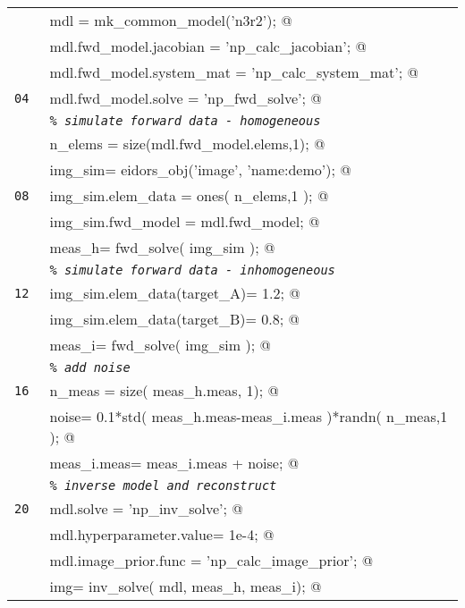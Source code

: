 \documentclass[12pt]{iopart}
\makeatletter
\newcommand{\CODEstart}{\medskip\begin{tabular}{ll}}
\newcommand{\CN}{\tt\scriptsize} %
\newcommand{\CC}{&\small\verb@}   % start code
\newcommand{\CI}{&\small\tt\em}   % start code
\newcommand{\CODEend}{\end{tabular}\medskip}
\makeatother
\begin{document}
\CODEstart
\CN    \CC mdl  = mk_common_model('n3r2');   @\\[-3pt]
\CN    \CC mdl.fwd_model.jacobian   = 'np_calc_jacobian';   @\\[-3pt]
\CN    \CC mdl.fwd_model.system_mat = 'np_calc_system_mat';   @\\[-3pt]
\CN 04 \CC mdl.fwd_model.solve      = 'np_fwd_solve';   @\\[-3pt]
\CN    \CI \% simulate forward data - homogeneous \\[-3pt]
\CN    \CC n_elems = size(mdl.fwd_model.elems,1);   @\\[-3pt]
\CN    \CC img_sim= eidors_obj('image', 'name:demo');   @\\[-3pt]
\CN 08 \CC img_sim.elem_data = ones( n_elems,1 );    @\\[-3pt]
\CN    \CC img_sim.fwd_model = mdl.fwd_model;   @\\[-3pt]
\CN    \CC meas_h= fwd_solve( img_sim );   @\\[-3pt]
\CN    \CI \% simulate forward data - inhomogeneous \\[-3pt]
\CN 12 \CC img_sim.elem_data(target_A)= 1.2;   @\\[-3pt]
\CN    \CC img_sim.elem_data(target_B)= 0.8;   @\\[-3pt]
\CN    \CC meas_i= fwd_solve( img_sim );   @\\[-3pt]
\CN    \CI \% add noise \\[-3pt]
\CN 16 \CC n_meas = size( meas_h.meas, 1); @\\[-3pt]
\CN    \CC noise= 0.1*std( meas_h.meas-meas_i.meas )*randn( n_meas,1 ); @\\[-3pt]
\CN    \CC meas_i.meas= meas_i.meas + noise; @\\[-3pt]
\CN    \CI \% inverse model and reconstruct\\[-3pt]
\CN 20 \CC mdl.solve               = 'np_inv_solve'; @\\[-3pt]
\CN    \CC mdl.hyperparameter.value= 1e-4; @\\[-3pt]
\CN    \CC mdl.image_prior.func    = 'np_calc_image_prior'; @\\[-3pt]
\CN    \CC img= inv_solve( mdl, meas_h, meas_i); @\\[-3pt]
\CODEend

%
%
\begin{figure}[th]
\end{figure}
\end{document}
